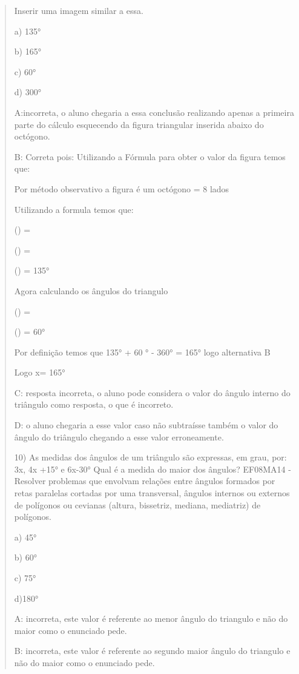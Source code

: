 \begin{quote}
\begin{escolha}
Inserir uma imagem similar a essa.

a) 135°

b) 165°

c) 60°

d) 300°

A:incorreta, o aluno chegaria a essa conclusão realizando apenas a
primeira parte do cálculo esquecendo da figura triangular inserida
abaixo do octógono.

B: Correta pois: Utilizando a Fórmula para obter o valor da figura temos
que:

Por método observativo a figura é um octógono = 8 lados

Utilizando a formula temos que:

() =

() =

() = 135°

Agora calculando os ângulos do triangulo

() =

() = 60°

Por definição temos que 135° + 60 ° - 360° = 165° logo alternativa B

Logo x= 165°

C: resposta incorreta, o aluno pode considera o valor do ângulo interno
do triângulo como resposta, o que é incorreto.

D: o aluno chegaria a esse valor caso não subtraísse também o valor do
ângulo do triângulo chegando a esse valor erroneamente.

10) As medidas dos ângulos de um triângulo são expressas, em grau, por:
3x, 4x +15° e 6x-30° Qual é a medida do maior dos ângulos? EF08MA14 -
Resolver problemas que envolvam relações entre ângulos formados por
retas paralelas cortadas por uma transversal, ângulos internos ou
externos de polígonos ou cevianas (altura, bissetriz, mediana,
mediatriz) de polígonos.

a) 45°

b) 60°

c) 75°

d)180°

A: incorreta, este valor é referente ao menor ângulo do triangulo e não
do maior como o enunciado pede.

B: incorreta, este valor é referente ao segundo maior ângulo do
triangulo e não do maior como o enunciado pede.


\end{escolha}
\end{quote}
